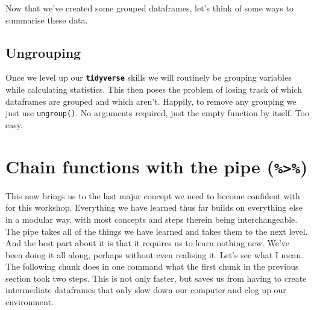 \documentclass[]{book}
\newenvironment{Shaded}{\begin{snugshade}}{\end{snugshade}}
\newcommand{\KeywordTok}[1]{\textcolor[rgb]{0.13,0.29,0.53}{\textbf{#1}}}
\newcommand{\DataTypeTok}[1]{\textcolor[rgb]{0.13,0.29,0.53}{#1}}
\newcommand{\DecValTok}[1]{\textcolor[rgb]{0.00,0.00,0.81}{#1}}
\newcommand{\StringTok}[1]{\textcolor[rgb]{0.31,0.60,0.02}{#1}}
\newcommand{\CommentTok}[1]{\textcolor[rgb]{0.56,0.35,0.01}{\textit{#1}}}
\newcommand{\OtherTok}[1]{\textcolor[rgb]{0.56,0.35,0.01}{#1}}
\newcommand{\OperatorTok}[1]{\textcolor[rgb]{0.81,0.36,0.00}{\textbf{#1}}}
\newcommand{\NormalTok}[1]{#1}
\theoremstyle{definition}
\theoremstyle{definition}
\theoremstyle{definition}
\theoremstyle{remark}
\begin{document}
Now that we've created some grouped dataframes, let's think of some ways
to summarise these data.

\subsection{Ungrouping}\label{ungrouping}

Once we level up our \textbf{\texttt{tidyverse}} skills we will
routinely be grouping variables while calculating statistics. This then
poses the problem of losing track of which dataframes are grouped and
which aren't. Happily, to remove any grouping we just use
\texttt{ungroup()}. No arguments required, just the empty function by
itself. Too easy.

\begin{Shaded}
\end{Shaded}

\section{\texorpdfstring{Chain functions with the pipe
(\texttt{\%\textgreater{}\%})}{Chain functions with the pipe (\%\textgreater{}\%)}}\label{chain-functions-with-the-pipe}

This now brings us to the last major concept we need to become confident
with for this workshop. Everything we have learned thus far builds on
everything else in a modular way, with most concepts and steps therein
being interchangeable. The pipe takes all of the things we have learned
and takes them to the next level. And the best part about it is that it
requires us to learn nothing new. We've been doing it all along, perhaps
without even realising it. Let's see what I mean. The following chunk
does in one command what the first chunk in the previous section took
two steps. This is not only faster, but saves us from having to create
intermediate dataframes that only slow down our computer and clog up our
environment.

\begin{Shaded}
\end{Shaded}
\end{document}
